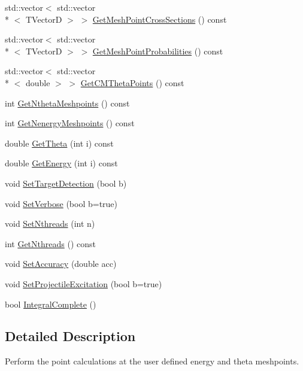 \begin{DoxyCompactItemize}
std\-::vector$<$ std\-::vector\\*
$<$ T\-Vector\-D $>$ $>$ \hyperlink{classIntegral_afb5537a85f73c946ef995c1c1a59f909}{Get\-Mesh\-Point\-Cross\-Sections} () const 
\item 
std\-::vector$<$ std\-::vector\\*
$<$ T\-Vector\-D $>$ $>$ \hyperlink{classIntegral_a034a680b2e03a448d8a34ca635570833}{Get\-Mesh\-Point\-Probabilities} () const 
\item 
std\-::vector$<$ std\-::vector\\*
$<$ double $>$ $>$ \hyperlink{classIntegral_a79c05e036d4bde6f0a4b58c43609341a}{Get\-C\-M\-Theta\-Points} () const 
\item 
int \hyperlink{classIntegral_a37791a2bc8dd6640b26aa9c360c2d805}{Get\-Ntheta\-Meshpoints} () const 
\item 
int \hyperlink{classIntegral_af7d797162b618f3208c8bef4c9f7eeb7}{Get\-Nenergy\-Meshpoints} () const 
\item 
double \hyperlink{classIntegral_acc8a52e50e9686382b268ac8d1de39e5}{Get\-Theta} (int i) const 
\item 
double \hyperlink{classIntegral_a52dcb2c1604ffa118afd970ca542add8}{Get\-Energy} (int i) const 
\item 
void \hyperlink{classIntegral_a81fa56a28123bee80b550d4f7eb01077}{Set\-Target\-Detection} (bool b)
\item 
void \hyperlink{classIntegral_a8becba09d3bc70a3eb3b6efe2322f2f2}{Set\-Verbose} (bool b=true)
\item 
void \hyperlink{classIntegral_a84f4e01efa07c82a073b7dec58fe0c4e}{Set\-Nthreads} (int n)
\item 
int \hyperlink{classIntegral_a61b3f87d0639f4bf96e9a2fcf9ba4111}{Get\-Nthreads} () const 
\item 
void \hyperlink{classIntegral_a303ccbd05093c67ce911a016bb799392}{Set\-Accuracy} (double acc)
\item 
void \hyperlink{classIntegral_a3d7ffeb56e3b5da4567b7c66e7d495cc}{Set\-Projectile\-Excitation} (bool b=true)
\item 
bool \hyperlink{classIntegral_af4e9c4f0f2e00a52d6651eec01d8109e}{Integral\-Complete} ()
\end{DoxyCompactItemize}


\subsection{Detailed Description}
Perform the point calculations at the user defined energy and theta meshpoints. 

